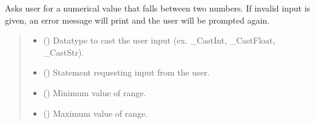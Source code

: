 \documentclass[letterpaper,10pt,english]{sphinxmanual}
\begin{document}
\begin{fulllineitems}
\begin{fulllineitems}
\label{\detokenize{GetUserInput:GetUserInput.UserInput.AskForTypeInRange}}
\pysigstartsignatures
{}
\pysigstopsignatures
\sphinxAtStartPar
Asks user for a numerical value that falls between two numbers. If invalid input is given, an         error message will print and the user will be prompted again.
\begin{quote}\begin{description}
\begin{itemize}
\item {} 
\sphinxAtStartPar
{} () \textendash{} Datatype to cast the user input (ex. \_CastInt, \_CastFloat, \_CastStr).

\item {} 
\sphinxAtStartPar
{} () \textendash{} Statement requesting input from the user.

\item {} 
\sphinxAtStartPar
{} (\sphinxstyleliteralemphasis{\sphinxupquote{ | }}) \textendash{} Minimum value of range.

\item {} 
\sphinxAtStartPar
{} (\sphinxstyleliteralemphasis{\sphinxupquote{ | }}) \textendash{} Maximum value of range.


\end{itemize}
\end{description}
\end{quote}
\end{fulllineitems}
\end{fulllineitems}
\end{document}
